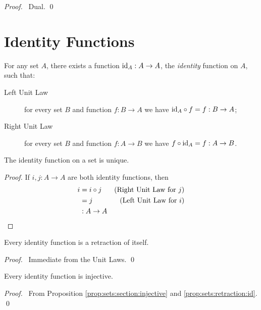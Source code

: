 \begin{proof}
  \pf\ Dual. \qed
\end{proof}

\section{Identity Functions}

\begin{ax}
  For any set $A$, there exists a function $\id{A} : A \rightarrow A$, the
  \emph{identity} function on $A$, such that:
  \begin{description}
    \item[Left Unit Law] for every set $B$ and function $f : B \rightarrow A$
    we have $\id{A} \circ f = f : B \rightarrow A$;
    \item[Right Unit Law] for every set $B$ and function $f : A \rightarrow
    B$ we have $f \circ \id{A} = f : A \rightarrow B$.
  \end{description}
\end{ax}

\begin{prop}
  The identity function on a set is unique.
\end{prop}

\begin{proof}
  \pf If $i, j : A \rightarrow A$ are both identity functions, then
  \begin{align*}
    i & = i \circ j & (\text{Right Unit Law for } j) \\
    & = j & (\text{Left Unit Law for } i) \\
    & : A \rightarrow A & \qed
  \end{align*}
\end{proof}

\begin{prop}
\label{prop:sets:retraction:id}
Every identity function is a retraction of itself.
\end{prop}

\begin{proof}
\pf\ Immediate from the Unit Laws. \qed
\end{proof}

\begin{prop}
  \label{prop:sets:identity:injective}
 Every identity function is injective.
\end{prop}

\begin{proof}
  \pf\ From Proposition \ref{prop:sets:section:injective} and
  \ref{prop:sets:retraction:id}. \qed
\end{proof}

